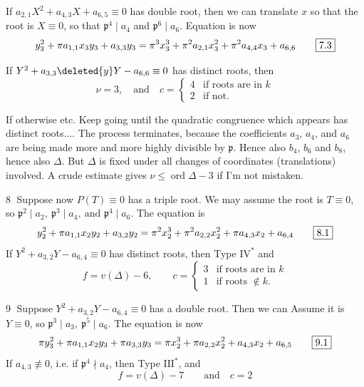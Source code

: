 \begingroup
\makeatletter
\tagsleft@true
\makeatother
\reversemarginpar
{}
If $a_{2,1}X^2+a_{4,3}X+a_{6,5}\equiv0$ has double root, then we can translate $x$ so that the root is $X\equiv0$, so that $\mathfrak p^4\mid a_4$ and $\mathfrak p^6\mid a_6$. Equation is now
\[
 y_3^2+\pi a_{1,1}x_3y_3+a_{3,3}y_3
 =\pi^3x_3^3+\pi^2a_{2,1}x_3^2+\pi^2a_{4,4}x_3+a_{6,6}
 \tag*{\fbox{7.3}}
\]

If $Y^2+a_{3,3}\deleted{y}Y-a_{6,6}\equiv0$ has distinct roots, then
\[
 \nu=3,\quad\text{and}\quad c=\begin{cases}
 4&\text{if roots are in }k\\
 2&\text{if not}.
 \end{cases}
\]

If otherwise  etc. Keep going until the quadratic congruence which appears has distinct roots.... The process terminates, because the coefficients $a_3$, $a_4$, and $a_6$ are being made more and more highly divisible by $\mathfrak p$. Hence also $b_4$, $b_6$ and $b_8$, hence also $\Delta$. But $\Delta$ is fixed under all changes of coordinates (translations) involved. A crude estimate gives $\nu\leq\operatorname{ord}\Delta-3$ if I'm not mistaken.

\textcircled{8} Suppose now $P(T)\equiv0$ has a triple root. We may assume the root is $T\equiv0$, so $\boxed{\mathfrak p^2\mid a_2,\ \mathfrak p^3\mid a_4,\ \text{and }\mathfrak p^4\mid a_6}$. The equation is
\[
 y_2^2+\pi a_{1,1}x_2y_2+a_{3,2}y_2
 =\pi^2x_2^3+\pi^2 a_{2,2}x_2^2+\pi a_{4,3}x_2+a_{6,4}
 \tag*{\fbox{8.1}}
\]
If $Y^2+a_{3,2}Y-a_{6,4}\equiv0$ has distinct roots, then Type $\mathrm{IV}^{*}$ and
\[
 f=v(\Delta)-6,\qquad c=\begin{cases}3&\text{if roots are in }k\\1&\text{if roots }\notin k.\end{cases}
\]

\textcircled{9} Suppose $Y^2+a_{3,2}Y-a_{6,4}\equiv0$ has a double root. Then we can Assume it is $Y\equiv0$, so $\boxed{\mathfrak p^3\mid a_3,\ \mathfrak p^5\mid a_6}$. The equation is now
\[
 \pi y_3^2+\pi a_{1,1}x_2y_3+\pi a_{3,3}y_3
 =\pi x_2^3+\pi a_{2,2}x_2^2+a_{4,3}x_2+a_{6,5}
 \tag*{\fbox{9.1}}
\]
If $a_{4,3}\not\equiv0$, i.e. if $\mathfrak p^4\nmid a_4$, then Type $\mathrm{III}^{*}$, and
\[
 f=v(\Delta)-7\qquad\text{and}\quad c=2
\]

